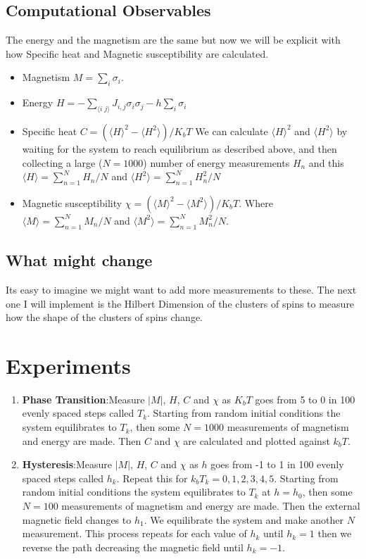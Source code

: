 \documentclass[]{scrartcl}
\begin{document}
	\subsection{Computational Observables}
	The energy and the magnetism are the same but now we will be explicit with how Specific heat and Magnetic susceptibility are calculated.
	\begin{itemize}
		\item Magnetism $M = \sum_i \sigma_i$.
		\item Energy $H = -\sum_{\langle i \;  j \rangle} J_{i,j} \sigma_i \sigma_j -h \sum_i \sigma_i$ 
		\item Specific heat $C =(\langle H \rangle ^2 - \langle H^2 \rangle )/K_bT$ We can calculate $ \langle H \rangle ^2$ and $\langle H^2 \rangle$ by waiting for the system to reach equilibrium as described above, and then collecting a large ($N = 1000$) number of energy measurements $H_n$  and this $\langle H \rangle = \sum_{n=1}^N H_n/N$ and $\langle H^2 \rangle = \sum_{n=1}^N H_n^2/N$
		\item Magnetic susceptibility $\chi = (\langle M \rangle ^2 - \langle M^2 \rangle )/K_bT$. Where  $\langle M \rangle = \sum_{n=1}^N M_n/N$ and $\langle M^2 \rangle = \sum_{n=1}^N M_n^2/N$.
	\end{itemize}
	\subsection{What might change}
	Its easy to imagine we might want to add more measurements to these. The next one I will implement is the Hilbert Dimension of the clusters of spins to measure how the shape of the clusters of spins change.
	\section{Experiments}
	\begin{enumerate}
		\item \textbf{Phase Transition}:Measure $|M|$, $H$, $C$ and $\chi$ as $K_b T$ goes from 5 to 0 in 100 evenly spaced steps called $T_k$. Starting from random initial conditions the system equilibrates to $T_k$, then some $N= 1000$ measurements of magnetism and energy are made. Then $C$ and $\chi$ are calculated and plotted against $k_bT$.
		
		\item \textbf{Hysteresis}:Measure $|M|$, $H$, $C$ and $\chi$ as $h$ goes from -1 to 1 in 100 evenly spaced steps called $h_k$. Repeat this for $k_bT_k = {0,1,2,3,4,5}$. Starting from random initial conditions the system equilibrates to $T_k$ at $h = h_0$, then some $N= 100$ measurements of magnetism and energy are made. Then the external magnetic field changes to $h_1$. We equilibrate the system and make another $N$ measurement. This process repeats for each value of $h_k$ until $h_k = 1$ then we reverse the path decreasing the magnetic field until $h_k = -1$.
		
	\end{enumerate}
	
\end{document}
